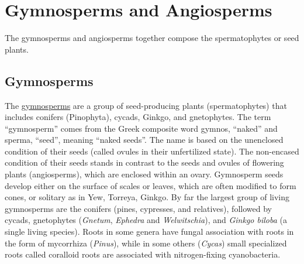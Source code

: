 \chapter{Gymnosperms and Angiosperms}\label{gymnosperms-and-angiosperms}

The gymnosperms and angiosperms together compose the spermatophytes or
seed plants.

\section{Gymnosperms}\label{gymnosperms}

The \href{https://en.wikipedia.org/wiki/Gymnosperm}{gymnosperms} are a
group of seed-producing plants (spermatophytes) that includes conifers
(Pinophyta), cycads, Ginkgo, and gnetophytes. The term ``gymnosperm''
comes from the Greek composite word gymnos, ``naked'' and sperma,
``seed'', meaning ``naked seeds''. The name is based on the unenclosed
condition of their seeds (called ovules in their unfertilized state).
The non-encased condition of their seeds stands in contrast to the seeds
and ovules of flowering plants (angiosperms), which are enclosed within
an ovary. Gymnosperm seeds develop either on the surface of scales or
leaves, which are often modified to form cones, or solitary as in Yew,
Torreya, Ginkgo. By far the largest group of living gymnosperms are the
conifers (pines, cypresses, and relatives), followed by cycads,
gnetophytes (\emph{Gnetum}, \emph{Ephedra} and \emph{Welwitschia}), and \emph{Ginkgo biloba} (a
single living species). Roots in some genera have fungal association
with roots in the form of mycorrhiza (\emph{Pinus}), while in some others
(\emph{Cycas}) small specialized roots called coralloid roots are associated
with nitrogen-fixing cyanobacteria.

